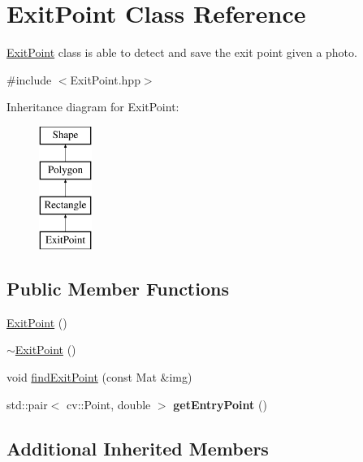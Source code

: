 \hypertarget{class_exit_point}{}\section{Exit\+Point Class Reference}
\label{class_exit_point}


\mbox{\hyperlink{class_exit_point}{Exit\+Point}} class is able to detect and save the exit point given a photo.  




{\ttfamily \#include $<$Exit\+Point.\+hpp$>$}

Inheritance diagram for Exit\+Point\+:\begin{figure}[H]
\begin{center}
\leavevmode
\includegraphics[height=4.000000cm]{class_exit_point}
\end{center}
\end{figure}
\subsection*{Public Member Functions}
\begin{DoxyCompactItemize}
\item 
\mbox{\hyperlink{class_exit_point_ae472f935e952356c9bfe64298474d523}{Exit\+Point}} ()
\item 
\mbox{\hyperlink{class_exit_point_aa764fee5b37cb7dbda6f2fde39ffbc05}{$\sim$\+Exit\+Point}} ()
\item 
void \mbox{\hyperlink{class_exit_point_a2762c0c61bbe71a1a292b86e9517e860}{find\+Exit\+Point}} (const Mat \&img)
\item 
\mbox{\label{class_exit_point_ac9eac55550c26f1abb2e426a942529ec}} 
std\+::pair$<$ cv\+::\+Point, double $>$ {\bfseries get\+Entry\+Point} ()
\end{DoxyCompactItemize}
\subsection*{Additional Inherited Members}


